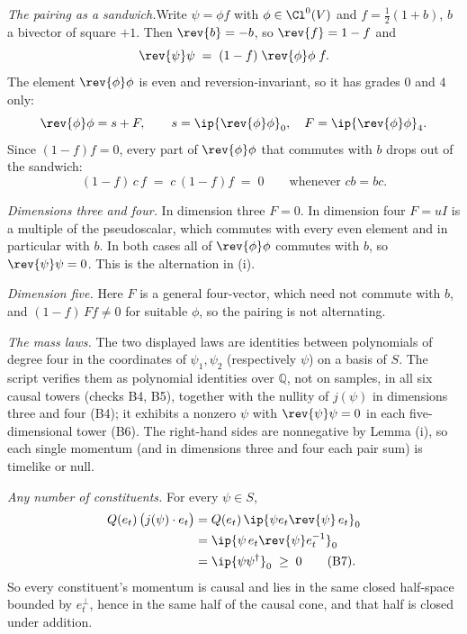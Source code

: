 \textit{The pairing as a sandwich.}\enspace Write $\psi = \phi f$ with $\phi \in \Cl^{0}(V)$ and $f = \tfrac{1}{2}(1 + b)$, $b$ a bivector of square $+1$. Then $\rev{b} = -b$, so $\rev{f} = 1 - f$ and
\[
\rev{\psi}\psi \;=\; (1 - f)\;\rev{\phi}\phi\;f.
\]
The element $\rev{\phi}\phi$ is even and reversion-invariant, so it has grades $0$ and $4$ only:
\[
\rev{\phi}\phi = s + F, \qquad s = \ip{\rev{\phi}\phi}_{0}, \quad F = \ip{\rev{\phi}\phi}_{4}.
\]
Since $(1 - f)f = 0$, every part of $\rev{\phi}\phi$ that commutes with $b$ drops out of the sandwich:
\[
(1 - f)\,c\,f \;=\; c\,(1 - f)f \;=\; 0 \qquad \text{whenever } cb = bc.
\]



\emph{Dimensions three and four.}  In dimension three $F = 0$. In dimension four $F = uI$ is a multiple of the pseudoscalar, which commutes with every even element and in particular with $b$. In both cases all of $\rev{\phi}\phi$ commutes with $b$, so $\rev{\psi}\psi = 0$. This is the alternation in (i).



\emph{Dimension five.}  Here $F$ is a general four-vector, which need not commute with $b$, and $(1 - f)\,F f \neq 0$ for suitable $\phi$, so the pairing is not alternating.



\emph{The mass laws.}  The two displayed laws are identities between polynomials of degree four in the coordinates of $\psi_{1}, \psi_{2}$ (respectively $\psi$) on a basis of $S$. The script verifies them as polynomial identities over $\mathbb{Q}$, not on samples, in all six causal towers (checks B4, B5), together with the nullity of $j(\psi)$ in dimensions three and four (B4); it exhibits a nonzero $\psi$ with $\rev{\psi}\psi = 0$ in each five-dimensional tower (B6). The right-hand sides are nonnegative by Lemma (i), so each single momentum (and in dimensions three and four each pair sum) is timelike or null.



\emph{Any number of constituents.}  For every $\psi \in S$,
\begin{align*}
Q(e_{t})\,\bigl(j(\psi)\cdot e_{t}\bigr) &= Q(e_{t})\,\ip{\psi e_{t}\rev{\psi}\,e_{t}}_{0} \\
&= \ip{\psi\,e_{t}\rev{\psi}e_{t}^{-1}}_{0} \\
&= \ip{\psi\psi^{\dagger}}_{0} \;\geq\; 0 \qquad \text{(B7)}.
\end{align*}
So every constituent's momentum is causal and lies in the same closed half-space bounded by $e_{t}^{\perp}$, hence in the same half of the causal cone, and that half is closed under addition.
